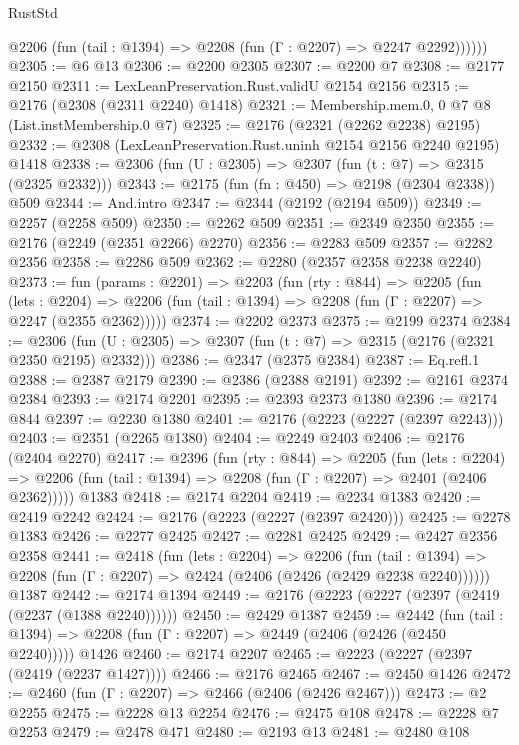 \begin{lexlean}{RustStd}
\begin{coremodule}
{\begin{coremodule}
{{{{{{{{{{          @2206 (fun (tail : @1394) => @2208 (fun (Γ : @2207) => @2247 @2292))))))
@2305 := @6 @13
@2306 := @2200 @2305
@2307 := @2200 @7
@2308 := @2177 @2150
@2311 := LexLeanPreservation.Rust.validU @2154 @2156
@2315 := @2176 (@2308 (@2311 @2240) @1418)
@2321 := Membership.mem.{0, 0} @7 @8 (List.instMembership.{0} @7)
@2325 := @2176 (@2321 (@2262 @2238) @2195)
@2332 := @2308 (LexLeanPreservation.Rust.uninh @2154 @2156 @2240 @2195) @1418
@2338 := @2306 (fun (U : @2305) => @2307 (fun (t : @7) => @2315 (@2325 @2332)))
@2343 := @2175 (fun (fn : @450) => @2198 (@2304 @2338)) @509
@2344 := And.intro
@2347 := @2344 (@2192 (@2194 @509))
@2349 := @2257 (@2258 @509)
@2350 := @2262 @509
@2351 := @2349 @2350
@2355 := @2176 (@2249 (@2351 @2266) @2270)
@2356 := @2283 @509
@2357 := @2282 @2356
@2358 := @2286 @509
@2362 := @2280 (@2357 @2358 @2238 @2240)
@2373 := fun (params : @2201) =>
  @2203
    (fun (rty : @844) =>
    @2205
      (fun (lets : @2204) =>
      @2206 (fun (tail : @1394) => @2208 (fun (Γ : @2207) => @2247 (@2355 @2362)))))
@2374 := @2202 @2373
@2375 := @2199 @2374
@2384 := @2306 (fun (U : @2305) => @2307 (fun (t : @7) => @2315 (@2176 (@2321 @2350 @2195) @2332)))
@2386 := @2347 (@2375 @2384)
@2387 := Eq.refl.{1}
@2388 := @2387 @2179
@2390 := @2386 (@2388 @2191)
@2392 := @2161 @2374 @2384
@2393 := @2174 @2201
@2395 := @2393 @2373 @1380
@2396 := @2174 @844
@2397 := @2230 @1380
@2401 := @2176 (@2223 (@2227 (@2397 @2243)))
@2403 := @2351 (@2265 @1380)
@2404 := @2249 @2403
@2406 := @2176 (@2404 @2270)
@2417 := @2396
    (fun (rty : @844) =>
    @2205
      (fun (lets : @2204) =>
      @2206 (fun (tail : @1394) => @2208 (fun (Γ : @2207) => @2401 (@2406 @2362)))))
    @1383
@2418 := @2174 @2204
@2419 := @2234 @1383
@2420 := @2419 @2242
@2424 := @2176 (@2223 (@2227 (@2397 @2420)))
@2425 := @2278 @1383
@2426 := @2277 @2425
@2427 := @2281 @2425
@2429 := @2427 @2356 @2358
@2441 := @2418
    (fun (lets : @2204) =>
    @2206
      (fun (tail : @1394) => @2208 (fun (Γ : @2207) => @2424 (@2406 (@2426 (@2429 @2238 @2240))))))
    @1387
@2442 := @2174 @1394
@2449 := @2176 (@2223 (@2227 (@2397 (@2419 (@2237 (@1388 @2240))))))
@2450 := @2429 @1387
@2459 := @2442
    (fun (tail : @1394) => @2208 (fun (Γ : @2207) => @2449 (@2406 (@2426 (@2450 @2240)))))
    @1426
@2460 := @2174 @2207
@2465 := @2223 (@2227 (@2397 (@2419 (@2237 @1427))))
@2466 := @2176 @2465
@2467 := @2450 @1426
@2472 := @2460 (fun (Γ : @2207) => @2466 (@2406 (@2426 @2467)))
@2473 := @2 @2255
@2475 := @2228 @13 @2254
@2476 := @2475 @108
@2478 := @2228 @7 @2253
@2479 := @2478 @471
@2480 := @2193 @13
@2481 := @2480 @108
}}}}}}}}}}
\end{coremodule}}
\end{coremodule}
\end{lexlean}
